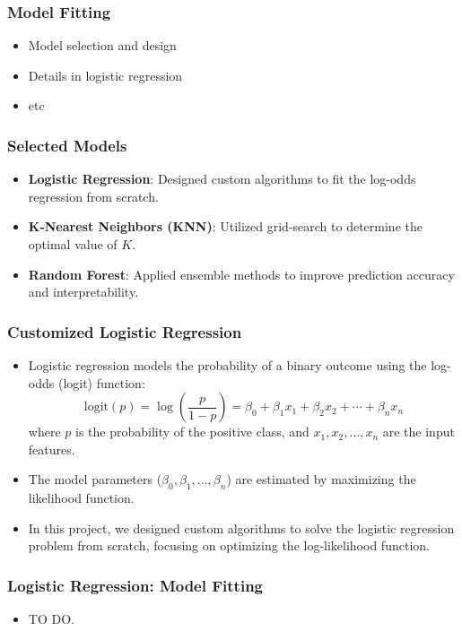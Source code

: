 \begin{frame}
    \frametitle{Model Fitting}
    \begin{itemize}
        \item Model selection and design
        \item Details in logistic regression
        \item etc
    \end{itemize}

    \end{frame}

\begin{frame}
    \frametitle{Selected Models}
    \begin{itemize}
        \item \textbf{Logistic Regression}: Designed custom algorithms to fit the log-odds regression from scratch.
        \item \textbf{K-Nearest Neighbors (KNN)}: Utilized grid-search to determine the optimal value of \( K \).
        \item \textbf{Random Forest}: Applied ensemble methods to improve prediction accuracy and interpretability.
    \end{itemize}
\end{frame}


\begin{frame}
    \frametitle{Customized Logistic Regression}
    \begin{itemize}
        \item Logistic regression models the probability of a binary outcome using the log-odds (logit) function:
        \[
        \text{logit}(p) = \log\left(\frac{p}{1-p}\right) = \beta_0 + \beta_1 x_1 + \beta_2 x_2 + \cdots + \beta_n x_n
        \]
        where \( p \) is the probability of the positive class, and \( x_1, x_2, \ldots, x_n \) are the input features.
        \item The model parameters (\( \beta_0, \beta_1, \ldots, \beta_n \)) are estimated by maximizing the likelihood function.
        \item In this project, we designed custom algorithms to solve the logistic regression problem from scratch, focusing on optimizing the log-likelihood function.
    \end{itemize}
\end{frame}

\begin{frame}
    \frametitle{Logistic Regression: Model Fitting}
    \begin{itemize}
        \item TO DO.
    \end{itemize}
\end{frame}

